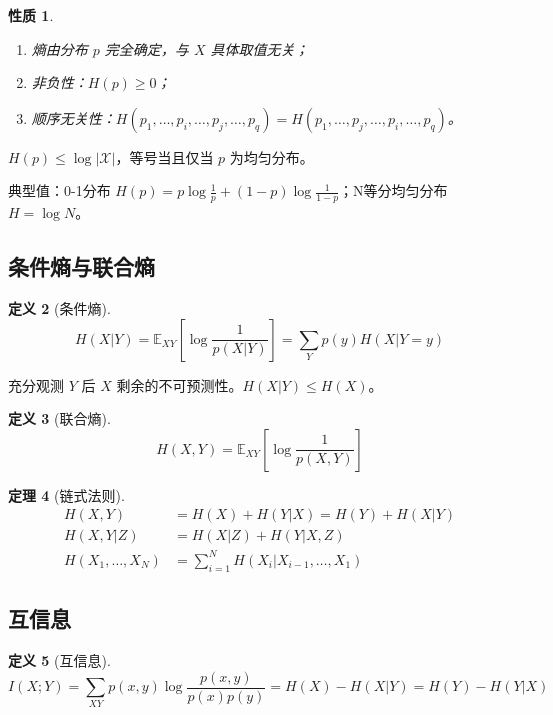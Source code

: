 \documentclass[12pt,a4paper]{ctexart}
\newtheorem{theorem}{定理}[section]
\newtheorem{property}[theorem]{性质}
\theoremstyle{definition}
\newtheorem{definition}[theorem]{定义}
\newcommand{\XX}{\mathcal{X}}
\begin{document}
\begin{property}
\begin{enumerate}[label=(\arabic*),nosep]
  \item 熵由分布 $p$ 完全确定，与 $X$ 具体取值无关；
  \item 非负性：$H(p) \geq 0$；
  \item 顺序无关性：$H(p_1,\ldots,p_i,\ldots,p_j,\ldots,p_q) = H(p_1,\ldots,p_j,\ldots,p_i,\ldots,p_q)$。
\end{enumerate}
\end{property}

\begin{keybox}[均匀分布熵最大]
$H(p) \leq \log|\XX|$，等号当且仅当 $p$ 为均匀分布。
\end{keybox}

典型值：0-1分布 $H(p) = p\log\frac{1}{p} + (1-p)\log\frac{1}{1-p}$；N等分均匀分布 $H = \log N$。

\subsection{条件熵与联合熵}

\begin{definition}[条件熵]
\[
H(X|Y) = \mathbb{E}_{XY}\left[\log\frac{1}{p(X|Y)}\right] = \sum_Y p(y)H(X|Y=y)
\]
\end{definition}

充分观测 $Y$ 后 $X$ 剩余的不可预测性。$H(X|Y) \leq H(X)$。

\begin{definition}[联合熵]
\[
H(X,Y) = \mathbb{E}_{XY}\left[\log\frac{1}{p(X,Y)}\right]
\]
\end{definition}

\begin{theorem}[链式法则]
\begin{align*}
H(X,Y) &= H(X) + H(Y|X) = H(Y) + H(X|Y) \\
H(X,Y|Z) &= H(X|Z) + H(Y|X,Z) \\
H(X_1,\ldots,X_N) &= \sum_{i=1}^{N} H(X_i | X_{i-1},\ldots,X_1)
\end{align*}
\end{theorem}

\subsection{互信息}

\begin{definition}[互信息]
\[
I(X;Y) = \sum_{XY} p(x,y) \log\frac{p(x,y)}{p(x)p(y)} = H(X) - H(X|Y) = H(Y) - H(Y|X)
\]
\end{definition}
\end{document}
